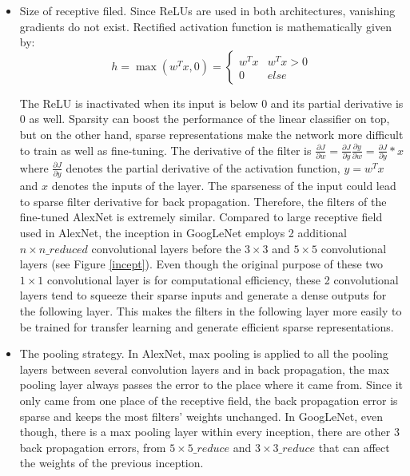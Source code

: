 \begin{itemize}
  \item Size of receptive filed. Since ReLUs are used in both architectures, vanishing gradients do not exist. Rectified activation function is mathematically given by:
      \begin{equation}\label{relu}
        h = \max ({w^T}x,0) = \left\{ {\begin{array}{*{20}{c}}
{{w^T}x}&{{w^T}x > 0}\\
0&{else}
\end{array}} \right.
      \end{equation}

    The ReLU is inactivated when its input is below 0 and its partial derivative is 0 as well. Sparsity can boost the performance of the linear classifier on top, but on the other hand, sparse representations make the network more difficult to train as well as fine-tuning. The derivative of the filter is $\frac{{\partial J}}{{\partial w}} = \frac{{\partial J}}{{\partial y}}\frac{{\partial y}}{{\partial w}} = \frac{{\partial J}}{{\partial y}}*x$ where $\frac{{\partial J}}{{\partial y}}$ denotes the partial derivative of the activation function, $y=w^Tx$ and $x$ denotes the inputs of the layer. The sparseness of the input could lead to sparse filter derivative for back propagation. Therefore, the filters of the fine-tuned AlexNet is extremely similar. Compared to large receptive field used in AlexNet, the inception in GoogLeNet employs 2 additional $n\times n\_reduced$ convolutional layers before the $3\times 3$ and $5\times 5$ convolutional layers (see Figure \ref{incept}). Even though the original purpose of these two $1\times 1$ convolutional layer is for computational efficiency, these 2 convolutional layers tend to squeeze their sparse inputs and generate a dense outputs for the following layer. This makes the filters in the following layer more easily to be trained for transfer learning and generate efficient sparse representations.
  \item The pooling strategy. In AlexNet, max pooling is applied to all the pooling layers between several convolution layers and in back propagation, the max pooling layer always passes the error to the place where it came from. Since it only came from one place of the receptive field, the back propagation error is sparse and keeps the most filters' weights unchanged. In GoogLeNet, even though, there is a max pooling layer within every inception, there are other 3 back propagation errors, from $5\times 5\_reduce$ and $3\times 3\_reduce$ that can affect the weights of the previous inception.
\end{itemize}

